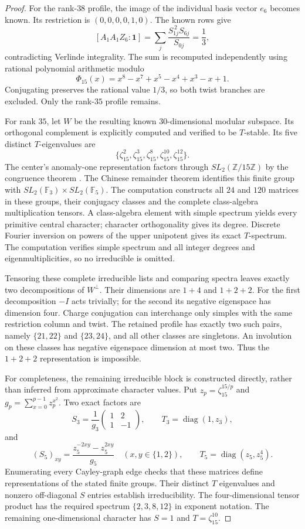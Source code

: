 \begin{proof}
For the rank-$38$ profile, the image of the individual basis vector
$e_6$ becomes known. Its restriction is $(0,0,0,0,1,0)$.
The known rows give
\[
 [A_1A_1Z_6:\mathbf1]
 =\sum_j\frac{S_{1j}^{\,2}S_{6j}}{S_{0j}}
 =\frac13,
\]
contradicting Verlinde integrality. The sum is recomputed independently
using rational polynomial arithmetic modulo
\[
 \Phi_{15}(x)=x^8-x^7+x^5-x^4+x^3-x+1.
\]
Conjugating preserves the rational value $1/3$, so both twist branches
are excluded. Only the rank-$35$ profile remains.

For rank $35$, let $W$ be the resulting known $30$-dimensional modular
subspace. Its orthogonal complement is explicitly computed and verified
to be $T$-stable. Its five distinct $T$-eigenvalues are
\[
 \{\zeta_{15}^{2},\zeta_{15}^{3},\zeta_{15}^{8},
   \zeta_{15}^{10},\zeta_{15}^{12}\}.
\]
The center's anomaly-one representation factors through
$SL_2(\mathbb Z/15\mathbb Z)$ by the congruence theorem
\cite[Theorem~II and Remark~4.5]{DLN}. The Chinese remainder theorem
identifies this finite group with
$SL_2(\mathbb F_3)\times SL_2(\mathbb F_5)$.
The computation constructs all $24$ and $120$ matrices in these groups,
their conjugacy classes and the complete class-algebra multiplication
tensors. A class-algebra element with simple spectrum yields every
primitive central character; character orthogonality gives its degree.
Discrete Fourier inversion on powers of the upper unipotent gives its
exact $T$-spectrum. The computation verifies simple spectrum and all
integer degrees and eigenmultiplicities, so no irreducible is omitted.

Tensoring these complete irreducible lists and comparing spectra leaves
exactly two decompositions of $W^\perp$. Their dimensions are
$1+4$ and $1+2+2$. For the first decomposition $-I$ acts trivially; for
the second its negative eigenspace has dimension four. Charge conjugation
can interchange only simples with the same restriction column and twist.
The retained profile has exactly two such pairs, namely
$\{21,22\}$ and $\{23,24\}$, and all other classes are singletons.
An involution on these classes has negative eigenspace dimension at most
two. Thus the $1+2+2$ representation is impossible.

For completeness, the remaining irreducible block is constructed
directly, rather than inferred from approximate character values.
Put $z_p=\zeta_{15}^{15/p}$ and
$g_p=\sum_{x=0}^{p-1}z_p^{x^2}$. Two exact factors are
\[
 S_3=\frac1{g_3}\begin{pmatrix}1&2\\1&-1\end{pmatrix},
 \qquad T_3=\operatorname{diag}(1,z_3),
\]
and
\[
 (S_5)_{xy}=\frac{z_5^{-2xy}-z_5^{2xy}}{g_5}
 \quad(x,y\in\{1,2\}),\qquad
 T_5=\operatorname{diag}(z_5,z_5^4).
\]
Enumerating every Cayley-graph edge checks that these matrices define
representations of the stated finite groups. Their distinct $T$
eigenvalues and nonzero off-diagonal $S$ entries establish irreducibility.
The four-dimensional tensor product has the required spectrum
$\{2,3,8,12\}$ in exponent notation. The remaining one-dimensional
character has $S=1$ and $T=\zeta_{15}^{10}$.


\end{proof}
